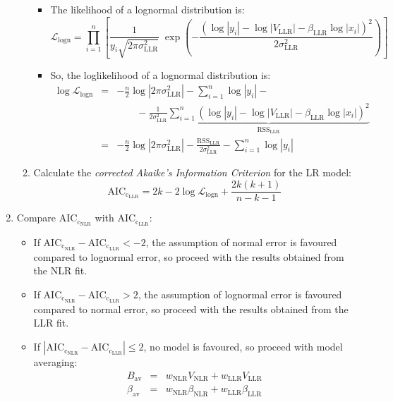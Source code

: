 \documentclass[12pt,oneside,letterpaper]{article}
\begin{document}
\begin{enumerate}
\begin{enumerate}
        \begin{itemize}
            \item The likelihood of a lognormal distribution is: 
            $$\mathcal{L}_\text{logn} = \prod_{i=1}^n\left[\frac{1}{y_i\sqrt{2\pi\sigma^2_\text{LLR}}}\;\exp{\left(-\frac{\left(\log|y_i|-\log|V_\text{LLR}|-\beta_\text{LLR}\log|x_i|\right)^2}{2\sigma^2_\text{LLR}}\right)}\right]$$
            \item So, the loglikelihood of a lognormal distribution is: 
            \begin{eqnarray*}
                \log\mathcal{L}_\text{logn} &=& -\frac{n}{2}\log\left|2\pi\sigma^2_\text{LLR}\right| - \sum_{i=1}^n\log|y_i| -\\
                &&\qquad-\frac{1}{2\sigma^2_\text{LLR}}\underbrace{\sum_{i=1}^n\left(\log|y_i|-\log|V_\text{LLR}|-\beta_\text{LLR}\log|x_i|\right)^2}_{\mathrm{RSS
                }_\text{LLR}}\\
                &=& -\frac{n}{2}\log\left|2\pi\sigma^2_\text{LLR}\right| - \frac{\mathrm{RSS}_\text{LLR}}{2\sigma^2_\text{LLR}} - \sum_{i=1}^n\log|y_i|
            \end{eqnarray*}
        \end{itemize}
        \item Calculate the \emph{corrected Akaike's Information Criterion} for the LR model: 
        	$$\mathrm{AIC_{c_{LLR}}} = 2k - 2\log\mathcal{L}_\text{logn} + \frac{2k(k+1)}{n-k-1}$$
    \end{enumerate}
    \item Compare $\mathrm{AIC_{c_{NLR}}}$ with $\mathrm{AIC_{c_{LLR}}}$:
    \begin{itemize}
        \item If $\mathrm{AIC_{c_{NLR}}} - \mathrm{AIC_{c_{LLR}}} < -2$, the assumption of normal error is favoured compared to lognormal error, so proceed with the results obtained from the NLR fit.
        \item If $\mathrm{AIC_{c_{NLR}}} - \mathrm{AIC_{c_{LLR}}} > 2$, the assumption of lognormal error is favoured compared to normal error, so proceed with the results obtained from the LLR fit.
        \item If $\left|\mathrm{AIC_{c_{NLR}}} - \mathrm{AIC_{c_{LLR}}}\right| \leq 2$, no model is favoured, so proceed with model averaging:
        \begin{eqnarray*}
            B_\text{av} &=& w_\text{NLR}V_\text{NLR} + w_\text{LLR}V_\text{LLR} \\
            \beta_\text{av} &=& w_\text{NLR}\beta_\text{NLR} + w_\text{LLR}\beta_\text{LLR}

\end{eqnarray*}
\end{itemize}
\end{enumerate}
\end{document}
